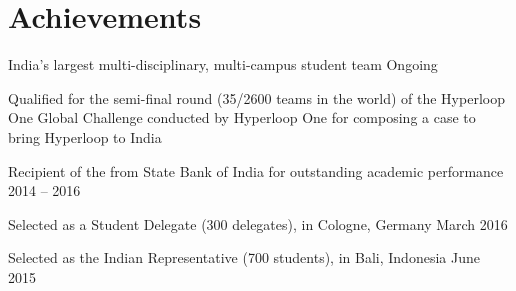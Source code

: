 \documentclass[]{deedy-resume-openfont}
\begin{document}
\begin{minipage}[t]{0.66\textwidth}
\section{Achievements}
\vspace{0.5em}
\begin{tightemize}
\item {}  India’s largest multi-disciplinary, multi-campus student team \hfill Ongoing\\
\begin{tightemize}
\vspace{\topsep}
\item \footnotesize {Qualified for the semi-final round (35/2600 teams in the world) of the Hyperloop One Global Challenge conducted by Hyperloop One for composing a case to bring Hyperloop to India}
\end{tightemize}
\vspace{0.5em}
\item Recipient of the  from State Bank of India for outstanding academic performance \hfill 2014 -- 2016\\
\vspace{0.2em}
\item Selected as a Student Delegate (300 delegates),  in Cologne, Germany \hfill March 2016\\
\vspace{0.2em}
\item Selected as the Indian Representative (700 students),  in Bali, Indonesia \hfill June 2015
\end{tightemize}
\sectionsep

\end{minipage} 
\end{document}
